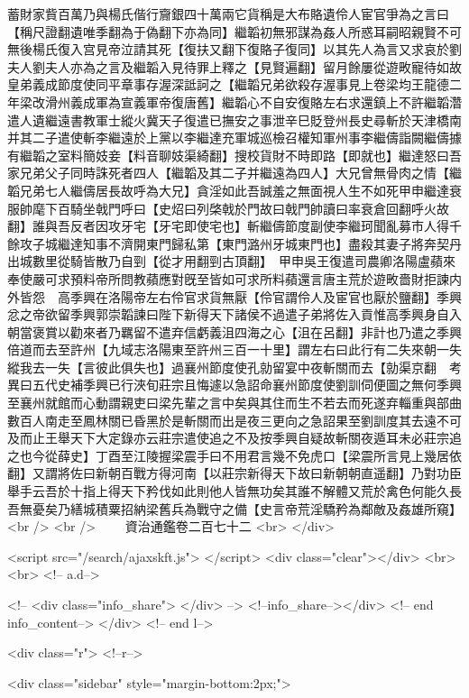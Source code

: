 蓄財家貲百萬乃與楊氏偕行齎銀四十萬兩它貨稱是大布賂遺伶人宦官爭為之言曰【稱尺證翻遺唯季翻為于偽翻下亦為同】繼韜初無邪謀為姦人所惑耳嗣昭親賢不可無後楊氏復入宫見帝泣請其死【復扶又翻下復賂子復同】以其先人為言又求哀於劉夫人劉夫人亦為之言及繼韜入見待罪上釋之【見賢遍翻】留月餘屢從遊畋寵待如故皇弟義成節度使同平章事存渥深詆訶之【繼韜兄弟欲殺存渥事見上卷梁均王龍德二年梁改滑州義成軍為宣義軍帝復唐舊】繼韜心不自安復賂左右求還鎮上不許繼韜濳遣人遺繼遠書教軍士縱火冀天子復遣已撫安之事泄辛巳貶登州長史尋斬於天津橋南并其二子遣使斬李繼遠於上黨以李繼達充軍城巡檢召權知軍州事李繼儔詣闕繼儔據有繼韜之室料簡妓妾【料音聊妓渠綺翻】搜校貨財不時即路【即就也】繼達怒曰吾家兄弟父子同時誅死者四人【繼韜及其二子并繼遠為四人】大兄曾無骨肉之情【繼韜兄弟七人繼儔居長故呼為大兄】貪淫如此吾誠羞之無面視人生不如死甲申繼達衰服帥麾下百騎坐戟門呼曰【史炤曰列棨戟於門故曰戟門帥讀曰率衰倉回翻呼火故翻】誰與吾反者因攻牙宅【牙宅即使宅也】斬繼儔節度副使李繼珂聞亂募市人得千餘攻子城繼達知事不濟開東門歸私第【東門潞州牙城東門也】盡殺其妻子將奔契丹出城數里從騎皆散乃自剄【從才用翻剄古頂翻】　甲申吳王復遣司農卿洛陽盧蘋來奉使嚴可求預料帝所問教蘋應對旣至皆如可求所料蘋還言唐主荒於遊畋嗇財拒諫内外皆怨　高季興在洛陽帝左右伶官求貨無厭【伶官謂伶人及宦官也厭於鹽翻】季興忿之帝欲留季興郭崇韜諫曰陛下新得天下諸侯不過遣子弟將佐入貢惟高季興身自入朝當褒賞以勸來者乃羈留不遣弃信虧義沮四海之心【沮在呂翻】非計也乃遣之季興倍道而去至許州【九域志洛陽東至許州三百一十里】謂左右曰此行有二失來朝一失縱我去一失【言彼此俱失也】過襄州節度使孔勍留宴中夜斬關而去【勍渠京翻　考異曰五代史補季興已行浹旬莊宗且悔遽以急詔命襄州節度使劉訓伺便圖之無何季興至襄州就館而心動謂親吏曰梁先輩之言中矣與其住而生不若去而死遂弃輜重與部曲數百人南走至鳳林關已昏黑於是斬關而出是夜三更向之急詔果至劉訓度其去遠不可及而止王舉天下大定錄亦云莊宗遣使追之不及按季興自疑故斬關夜遁耳未必莊宗追之也今從薛史】丁酉至江陵握梁震手曰不用君言幾不免虎口【梁震所言見上幾居依翻】又謂將佐曰新朝百戰方得河南【以莊宗新得天下故曰新朝朝直遥翻】乃對功臣舉手云吾於十指上得天下矜伐如此則他人皆無功矣其誰不解體又荒於禽色何能久長吾無憂矣乃繕城積粟招納梁舊兵為戰守之備【史言帝荒淫驕矜為鄰敵及姦雄所窺】<br />
<br />
　　資治通鑑卷二百七十二  <br>
   </div> 

<script src="/search/ajaxskft.js"> </script>
 <div class="clear"></div>
<br>
<br>
 <!-- a.d-->

 <!--
<div class="info_share">
</div> 
-->
 <!--info_share--></div>   <!-- end info_content-->
  </div> <!-- end l-->

<div class="r">   <!--r-->



<div class="sidebar"  style="margin-bottom:2px;">


